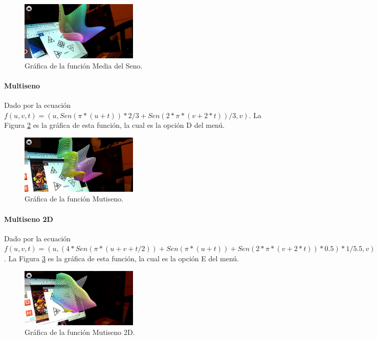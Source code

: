 \begin{figure}[hbt!]
\centering
\includegraphics[width=0.5\textwidth]{figuras/graficas/media_seno.png}
\caption{\label{fig:graf_media_seno}Gráfica de la función Media del Seno.}
\end{figure}
\FloatBarrier

\paragraph{Multiseno}
Dado por la ecuación $f(u,v,t)=(u,Sen(\pi * (u + t))*2/3+Sen(2 * \pi * (v + 2 * t))/3,v)$. La Figura \ref{fig:graf_multiseno} es la gráfica de esta función, la cual es la opción D del menú.

\begin{figure}[hbt!]
\centering
\includegraphics[width=0.5\textwidth]{figuras/graficas/multiseno.png}
\caption{\label{fig:graf_multiseno}Gráfica de la función Mutiseno.}
\end{figure}
\FloatBarrier

\paragraph{Multiseno 2D}
Dado por la ecuación $f(u,v,t)=(u, (4 * Sen(\pi * (u + v + t / 2)) + Sen(\pi * (u + t)) + Sen(2 * \pi * (v + 2 * t)) * 0.5) * 1 / 5.5,v)$. La Figura \ref{fig:graf_multiseno2d} es la gráfica de esta función, la cual es la opción E del menú.

\begin{figure}[hbt!]
\centering
\includegraphics[width=0.5\textwidth]{figuras/graficas/multiseno2d.png}
\caption{\label{fig:graf_multiseno2d}Gráfica de la función Mutiseno 2D.}
\end{figure}
\FloatBarrier

